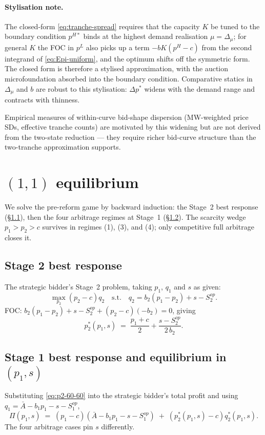 \documentclass[11pt]{article}
\begin{document}
\paragraph{Stylisation note.} The closed-form \eqref{eq:tranche-spread} requires that the capacity $K$ be tuned to the boundary condition $p^{H*}$ binds at the highest demand realisation $\mu = \Delta_\mu$; for general $K$ the FOC in $p^L$ also picks up a term $-bK(p^H-c)$ from the second integrand of \eqref{eq:Epi-uniform}, and the optimum shifts off the symmetric form. The closed form is therefore a stylised approximation, with the auction microfoundation absorbed into the boundary condition. Comparative statics in $\Delta_\mu$ and $b$ are robust to this stylisation: $\Delta p^*$ widens with the demand range and contracts with thinness.

Empirical measures of within-curve bid-shape dispersion (MW-weighted price SDs, effective tranche counts) are motivated by this widening but are not derived from the two-state reduction --- they require richer bid-curve structure than the two-tranche approximation supports.

\section{$(1,1)$ equilibrium}\label{app:state-60-60}

We solve the pre-reform game by backward induction: the Stage~2 best response (\S\ref{app:60-60:stage2}), then the four arbitrage regimes at Stage~1 (\S\ref{app:60-60:stage1}). The scarcity wedge $p_1 > p_2 > c$ survives in regimes (1), (3), and (4); only competitive full arbitrage closes it.

\subsection{Stage 2 best response}\label{app:60-60:stage2}
The strategic bidder's Stage~2 problem, taking $p_1$, $q_1$ and $s$ as given:
\[
\max_{p_2} (p_2 - c) q_2 \quad\text{s.t.}\quad q_2 = b_2(p_1 - p_2) + s - S^{op}_2.
\]
FOC: $b_2(p_1 - p_2) + s - S^{op}_2 + (p_2 - c)(-b_2) = 0$, giving
\begin{equation}
p_2^*(p_1, s) \;=\; \frac{p_1 + c}{2} + \frac{s - S^{op}_2}{2\, b_2}.
\label{eq:p2-60-60}
\end{equation}

\subsection{Stage 1 best response and equilibrium in $(p_1, s)$}\label{app:60-60:stage1}
Substituting \eqref{eq:p2-60-60} into the strategic bidder's total profit and using $q_1 = \bar A - b_1 p_1 - s - S^{op}_1$,
\[
\Pi(p_1, s) \;=\; (p_1 - c)(\bar A - b_1 p_1 - s - S^{op}_1) \;+\; (p_2^*(p_1, s) - c) q_2^*(p_1, s).
\]
\noindent The four arbitrage cases pin $s$ differently.
\end{document}
